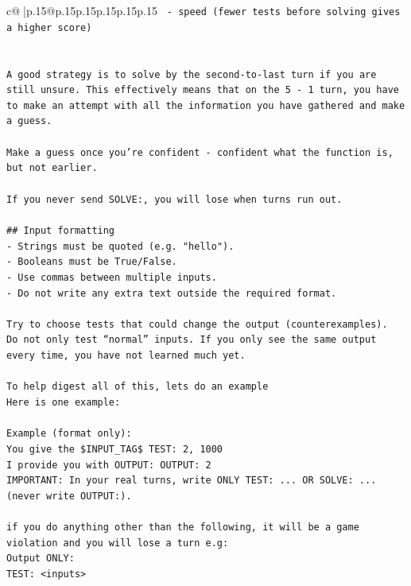 \documentclass{article}
\begin{document}
{\begin{supertabular}{c@{$\;$}|p{.15\linewidth}@{}p{.15\linewidth}p{.15\linewidth}p{.15\linewidth}p{.15\linewidth}p{.15\linewidth}}
{{{\texttt{		{-} speed (fewer tests before solving gives a higher score)} \\
\\ 
\\ 
\texttt{A good strategy is to solve by the second{-}to{-}last turn if you are still unsure. This effectively means that on the 5 {-} 1 turn, you have to make an attempt with all the information you have gathered and make a guess.} \\
\\ 
\texttt{Make a guess once you're confident {-} confident what the function is, but not earlier.} \\
\\ 
\texttt{If you never send SOLVE:, you will lose when turns run out.} \\
\\ 
\texttt{\#\# Input formatting} \\
\texttt{{-} Strings must be quoted (e.g. "hello").} \\
\texttt{{-} Booleans must be True/False.} \\
\texttt{{-} Use commas between multiple inputs.} \\
\texttt{{-} Do not write any extra text outside the required format.} \\
\\ 
\texttt{Try to choose tests that could change the output (counterexamples).} \\
\texttt{Do not only test “normal” inputs. If you only see the same output every time, you have not learned much yet.} \\
\\ 
\texttt{To help digest all of this, lets do an example} \\
\texttt{Here is one example:} \\
\\ 
\texttt{Example (format only):} \\
\texttt{You give the \$INPUT\_TAG\$ TEST: 2, 1000} \\
\texttt{I provide you with OUTPUT: OUTPUT: 2} \\
\texttt{IMPORTANT: In your real turns, write ONLY TEST: ... OR SOLVE: ... (never write OUTPUT:).} \\
\\ 
\texttt{if you do anything other than the following, it will be a game violation and you will lose a turn e.g:} \\
\texttt{Output ONLY:} \\
\texttt{TEST: <inputs>} \\
}}}
\end{supertabular}}
\end{document}
